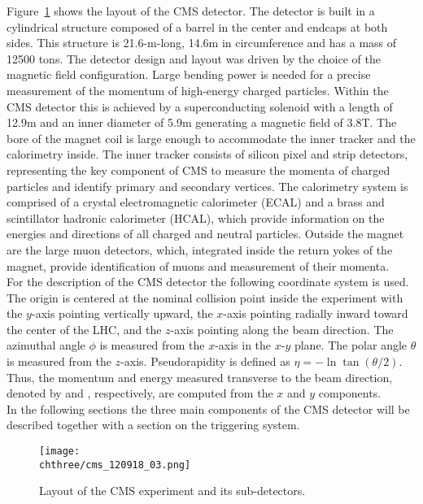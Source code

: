 Figure~\ref{fig:CMSlayout} shows the layout of the CMS detector. The detector is built in a cylindrical structure composed of a barrel in the center and endcaps at both sides. This structure is 21.6-m-long, 14.6\unit{m} in circumference and has a mass of 12500 tons. The detector design and layout was driven by the choice of the magnetic field configuration. Large bending power is needed for a precise measurement of the momentum of high-energy charged particles. Within the CMS detector this is achieved by a superconducting solenoid with a length of 12.9\unit{m} and an inner diameter of 5.9\unit{m} generating a magnetic field of 3.8\unit{T}. The bore of the magnet coil is large enough to accommodate the inner tracker and the calorimetry inside. 
The inner tracker consists of silicon pixel and strip detectors, representing the key component of CMS to measure the momenta of charged particles and identify primary and secondary vertices. The calorimetry system is comprised of a crystal electromagnetic calorimeter (ECAL) and a brass and scintillator hadronic calorimeter (HCAL), which provide information on the energies and directions of all charged and neutral particles. Outside the magnet are the large muon detectors, which, integrated inside the return yokes of the magnet, provide identification of muons and measurement of their momenta.\\

For the description of the CMS detector the following coordinate system is used. The origin is centered at the nominal collision point inside the experiment with the $y$-axis pointing vertically upward, the $x$-axis pointing radially inward toward the center of the LHC, and the $z$-axis pointing along the beam direction. The azimuthal angle $\phi$ is measured from the $x$-axis in the $x$-$y$ plane. The polar angle $\theta$ is measured from the $z$-axis. Pseudorapidity is defined as $\eta = -\ln\tan(\theta/2)$. Thus, the momentum and energy measured transverse to the beam direction, denoted by \PT and \ET, respectively, are computed from the $x$ and $y$ components.\\

In the following sections the three main components of the CMS detector will be described together with a section on the triggering system.

\begin{figure}[!htb]
 \begin{center}
  \texttt{[image: \\chthree/cms\_120918\_03.png]}
 \end{center}
 \caption{Layout of the CMS experiment and its sub-detectors.}
 \label{fig:CMSlayout}
\end{figure}

